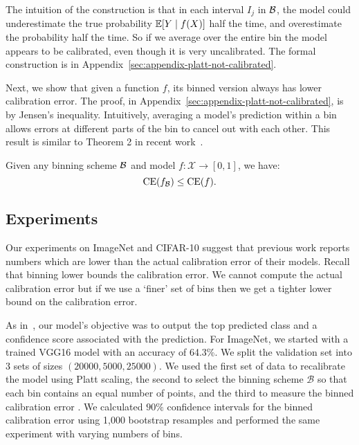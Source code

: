 \begin{example}
\label{ex:continuous-not-calibrated}
\continuousNotCalibratedText{}
\end{example}

\newtheorem*{continuousNotCalibrated}{Restatement of Example~\ref{ex:continuous-not-calibrated}}

The intuition of the construction is that in each interval $I_j$ in $\mathcal{B}{}$, the model could underestimate the true probability $\mathbb{E}[Y \mid f(X)]$ half the time, and overestimate the probability half the time. So if we average over the entire bin the model appears to be calibrated, even though it is very uncalibrated. The formal construction is in Appendix~\ref{sec:appendix-platt-not-calibrated}.

Next, we show that given a function $f$, its binned version always has lower calibration error. The proof, in Appendix~\ref{sec:appendix-platt-not-calibrated}, is by Jensen's inequality. Intuitively, averaging a model's prediction within a bin allows errors at different parts of the bin to cancel out with each other. This result is similar to Theorem 2 in recent work~\cite{vaicenavicius2019calibration}.

\newcommand{\binningLowerBoundText}{
  Given any binning scheme $\bins{}$ and model $f : \mathcal{X} \to [0, 1]$, we have:
\[  \ce(f_{\bins{}}) \leq \ce(f). \]
\pl{number the equations}
}

\begin{proposition}
\label{prop:bin_low_bound}
\binningLowerBoundText{}
\end{proposition}

\newtheorem*{binningLowerBound}{Restatement of Proposition~\ref{prop:bin_low_bound}}

\subsection{Experiments}

Our experiments on ImageNet and CIFAR-10 suggest that previous work reports numbers which are lower than the actual calibration error of their models. Recall that binning lower bounds the calibration error. We cannot compute the actual calibration error but if we use a `finer' set of bins then we get a tighter lower bound on the calibration error.

As in~\cite{guo2017calibration}, our model's objective was to output the top predicted class and a confidence score associated with the prediction. For ImageNet, we started with a trained VGG16 model with an accuracy of 64.3\%. We split the validation set into 3 sets of sizes $(20000, 5000, 25000)$. We used the first set of data to recalibrate the model using Platt scaling, the second to select the binning scheme $\mathcal{B}$ so that each bin contains an equal number of points, and the third to measure the binned calibration error . We calculated $90\%$ confidence intervals for the binned calibration error using 1,000 bootstrap resamples and performed the same experiment with varying numbers of bins.

